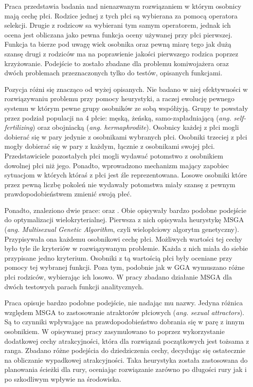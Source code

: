 \documentclass[./FM_mgr.tex]{subfiles}
\begin{document}
Praca \cite{sanchez} przedstawia badania nad nienazwanym rozwiązaniem w którym osobnicy mają cechę płci.
Rodzice jednej z tych płci są wybierana za pomocą operatora selekcji. 
Drugie z rodzicow sa wybierani tym samym operatorem, jednak ich ocena jest obliczana jako pewna funkcja oceny używanej przy płci pierwszej.
Funkcja ta bierze pod uwagę wiek osobnika oraz pewną miarę tego jak dużą szansę drugi z rodziców ma na poprawienie jakości pierwszego rodzica poprzez krzyżowanie.
Podejście to zostało zbadane dla problemu komiwojażera oraz dwóch problemach przeznaczonych tylko do testów, opisanych funkcjami.

Pozycja \cite{simulating} różni się znacząco od wyżej opisanych.
Nie badano w niej efektywności w rozwiązywaniu problemu przy pomocy heurystyki, a raczej ewolucję pewnego systemu w którym pewne grupy osobników ze sobą współżyją.
Grupy te powstały przez podział populacji na 4 płcie: męską, żeńską, samo-zapładniającą (\emph{ang. self-fertilizing}) oraz obojniacką (\emph{ang. hermaphrodite}).
Osobnicy każdej z płci mogli dobierać się w pary jedynie z osobnikami wybranych płci.
Osobniki trzeciej z płci mogły dobierać się w pary z każdym, łącznie z osobnikami swojej płci.
Przedstawiciele pozostałych płci mogli wydawać potomstwo z osobnikiem dowolnej płci niż jego.
Ponadto, wprowadzono mechanizm mający zapobiec sytuacjom w których któraś z płci jest źle reprezentowana.
Losowe osobniki które przez pewną liczbę pokoleń nie wydawały potomstwa miały szansę z pewnym prawdopodobieństwem zmienić swoją płeć.

Ponadto, znaleziono dwie prace: \cite{msga} oraz \cite{allenson}.
Obie opisywały bardzo podobne podejście do optymalizacji wielokryterialnej.
Pierwsza z nich opisywała heurystykę MSGA (\emph{ang. Multisexual Genetic Algorithm}, czyli wielopłciowy algorytm genetyczny).
Przypisywała ona każdemu osobnikowi cechę płci.
Możliwych wartości tej cechy było tyle ile kryteriów w rozwiązywanym problemie.
Każda z nich miała do siebie przypisane jedno kryterium.
Osobniki z tą wartością płci były oceniane przy pomocy tej wybranej funkcji.
Poza tym, podobnie jak w GGA wymuszano różne płci rodziców, wybierając ich losowo.
W pracy \cite{msga} zbadano działanie MSGA dla dwóch testowych parach funkcji analitycznych.

Praca \cite{allenson} opisuje bardzo podobne podejście, nie nadając mu nazwy.
Jedyna różnica względem MSGA to zastosowanie atraktorów płciowych (\emph{ang. sexual attractors}).
Są to czynniki wpływające na prawdopodobieństwo dobrania się w parę z innym osobnikiem.
W opisywanej pracy zasymulowano to poprzez wykorzystanie dodatkowej cechy atrakcyjności, która dla rozwiązań początkowych jest tożsama z ranga.
Zbadano różne podejścia do dziedziczenia cechy, decydując się ostatecznie na obliczanie wypadkowej atrakcyjności.
Taka heurystyka została zastosowana do planowania ścieżki dla rury, oceniając rozwiązanie zarówno po długości rury jak i po szkodliwym wpływie na środowiska.
\end{document}
